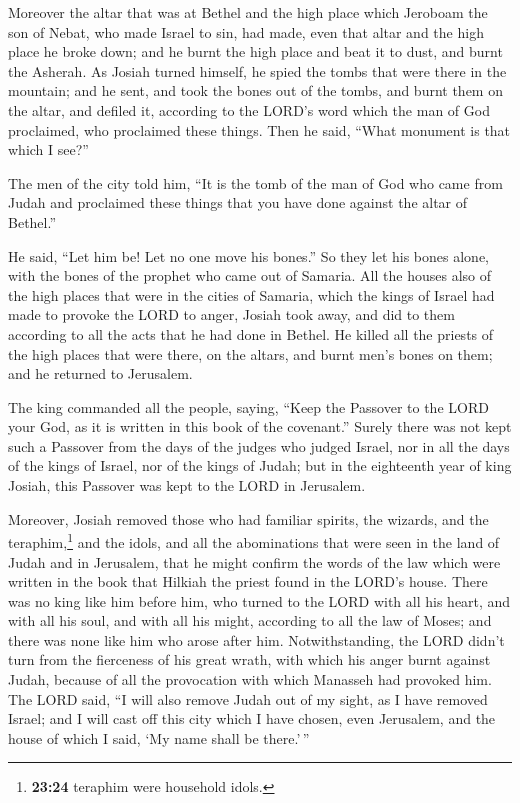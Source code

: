  Moreover the altar that was at Bethel and the high place
which Jeroboam the son of Nebat, who made Israel to sin, had made, even
that altar and the high place he broke down; and he burnt the high place
and beat it to dust, and burnt the Asherah.  As Josiah
turned himself, he spied the tombs that were there in the mountain; and
he sent, and took the bones out of the tombs, and burnt them on the
altar, and defiled it, according to the LORD's word which the man of God
proclaimed, who proclaimed these things.  Then he said,
``What monument is that which I see?''

The men of the city told him, ``It is the tomb of the man of God who
came from Judah and proclaimed these things that you have done against
the altar of Bethel.''

 He said, ``Let him be! Let no one move his bones.'' So
they let his bones alone, with the bones of the prophet who came out of
Samaria.  All the houses also of the high places that
were in the cities of Samaria, which the kings of Israel had made to
provoke the LORD to anger, Josiah took away, and did to them according
to all the acts that he had done in Bethel.  He killed
all the priests of the high places that were there, on the altars, and
burnt men's bones on them; and he returned to Jerusalem.

 The king commanded all the people, saying, ``Keep the
Passover to the LORD your God, as it is written in this book of the
covenant.''  Surely there was not kept such a Passover
from the days of the judges who judged Israel, nor in all the days of
the kings of Israel, nor of the kings of Judah;  but in
the eighteenth year of king Josiah, this Passover was kept to the LORD
in Jerusalem.

 Moreover, Josiah removed those who had familiar spirits,
the wizards, and the teraphim,\footnote{\textbf{23:24} teraphim were
  household idols.} and the idols, and all the abominations that were
seen in the land of Judah and in Jerusalem, that he might confirm the
words of the law which were written in the book that Hilkiah the priest
found in the LORD's house.  There was no king like him
before him, who turned to the LORD with all his heart, and with all his
soul, and with all his might, according to all the law of Moses; and
there was none like him who arose after him. 
Notwithstanding, the LORD didn't turn from the fierceness of his great
wrath, with which his anger burnt against Judah, because of all the
provocation with which Manasseh had provoked him.  The
LORD said, ``I will also remove Judah out of my sight, as I have removed
Israel; and I will cast off this city which I have chosen, even
Jerusalem, and the house of which I said, `My name shall be there.'\,''

